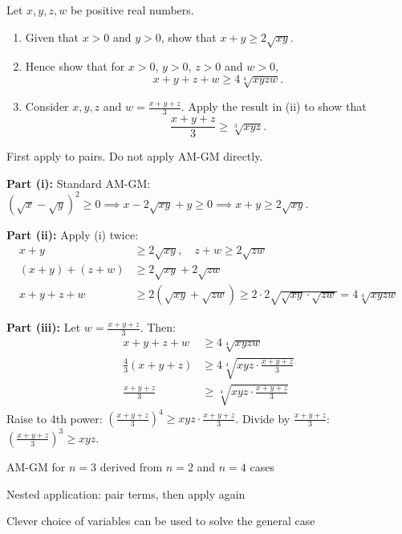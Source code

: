 \begin{problem}
Let $x, y, z, w$ be positive real numbers.
\begin{enumerate}
    \item[(i)] Given that $x>0$ and $y>0$, show that $x+y \ge 2\sqrt{xy}$.
    \item[(ii)] Hence show that for $x>0$, $y>0$, $z>0$ and $w>0$,
    \[ x+y+z+w \ge 4\sqrt[4]{xyzw}. \]
    \item[(iii)] Consider $x, y, z$ and $w = \frac{x+y+z}{3}$. Apply the result in (ii) to show that
    \[ \frac{x+y+z}{3} \ge \sqrt[3]{xyz}. \]
\end{enumerate}
\end{problem}

\begin{hint}
First apply to pairs. Do not apply AM-GM directly.
\end{hint}

\begin{solution}
\textbf{Part (i):} Standard AM-GM: $(\sqrt{x} - \sqrt{y})^2 \ge 0 \implies x - 2\sqrt{xy} + y \ge 0 \implies x+y \ge 2\sqrt{xy}$.

\textbf{Part (ii):} Apply (i) twice:
\begin{align*}
x+y &\ge 2\sqrt{xy}, \quad z+w \ge 2\sqrt{zw}\\
(x+y) + (z+w) &\ge 2\sqrt{xy} + 2\sqrt{zw}\\
x+y+z+w &\ge 2(\sqrt{xy} + \sqrt{zw}) \ge 2 \cdot 2\sqrt{\sqrt{xy} \cdot \sqrt{zw}} = 4\sqrt[4]{xyzw}
\end{align*}

\textbf{Part (iii):} Let $w = \frac{x+y+z}{3}$. Then:
\begin{align*}
x+y+z+w &\ge 4\sqrt[4]{xyzw}\\
\frac{4}{3}(x+y+z) &\ge 4\sqrt[4]{xyz \cdot \frac{x+y+z}{3}}\\
\frac{x+y+z}{3} &\ge \sqrt[4]{xyz \cdot \frac{x+y+z}{3}}
\end{align*}
Raise to 4th power: $\left(\frac{x+y+z}{3}\right)^4 \ge xyz \cdot \frac{x+y+z}{3}$. Divide by $\frac{x+y+z}{3}$: $\left(\frac{x+y+z}{3}\right)^3 \ge xyz$.
\end{solution}

\begin{takeaways}
\item AM-GM for $n=3$ derived from $n=2$ and $n=4$ cases
\item Nested application: pair terms, then apply again
\item Clever choice of variables can be used to solve the general case
\end{takeaways}
